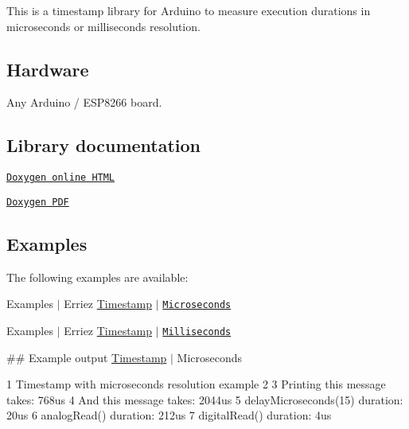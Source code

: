 \href{https://travis-ci.org/Erriez/ErriezTimestamp}{\tt }

This is a timestamp library for Arduino to measure execution durations in microseconds or milliseconds resolution.



\subsection*{Hardware}

Any Arduino / E\+S\+P8266 board.

\subsection*{Library documentation}


\begin{DoxyItemize}
\item \href{https://Erriez.github.io/ErriezTimestamp}{\tt Doxygen online H\+T\+ML}
\item \href{https://github.com/Erriez/ErriezTimestamp/raw/gh-pages/latex/ErriezTimestamp.pdf}{\tt Doxygen P\+DF}
\end{DoxyItemize}

\subsection*{Examples}

The following examples are available\+:
\begin{DoxyItemize}
\item Examples $\vert$ Erriez \hyperlink{class_timestamp}{Timestamp} $\vert$ \href{https://github.com/Erriez/ErriezTimestamp/blob/master/examples/Microseconds/Microseconds.ino}{\tt Microseconds}
\item Examples $\vert$ Erriez \hyperlink{class_timestamp}{Timestamp} $\vert$ \href{https://github.com/Erriez/ErriezTimestamp/blob/master/examples/Milliseconds/Milliseconds.ino}{\tt Milliseconds}
\end{DoxyItemize}

\#\# Example output \hyperlink{class_timestamp}{Timestamp} $\vert$ Microseconds 
\begin{DoxyCode}
1 Timestamp with microseconds resolution example
2 
3 Printing this message takes: 768us
4 And this message takes: 2044us
5 delayMicroseconds(15) duration: 20us
6 analogRead() duration: 212us
7 digitalRead() duration: 4us
\end{DoxyCode}


